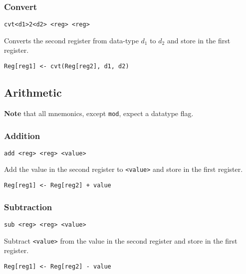 \subsubsection{Convert}

\begin{lstlisting}[style=assembly]
    cvt<d1>2<d2> <reg> <reg>
\end{lstlisting}

Converts the second register from data-type \(d_1\) to \(d_2\) and store in the first register.

\begin{lstlisting}[style=rtn]
    Reg[reg1] <- cvt(Reg[reg2], d1, d2)
\end{lstlisting}

\subsection{Arithmetic}

\textbf{Note} that all mnemonics, except \texttt{mod}, expect a datatype flag.

\subsubsection{Addition}

\begin{lstlisting}[style=assembly]
    add <reg> <reg> <value>
\end{lstlisting}

Add the value in the second register to \texttt{<value>} and store in the first register.

\begin{lstlisting}[style=rtn]
    Reg[reg1] <- Reg[reg2] + value
\end{lstlisting}

\subsubsection{Subtraction}

\begin{lstlisting}[style=assembly]
    sub <reg> <reg> <value>
\end{lstlisting}

Subtract \texttt{<value>} from the value in the second register and store in the first register.

\begin{lstlisting}[style=rtn]
    Reg[reg1] <- Reg[reg2] - value
\end{lstlisting}

